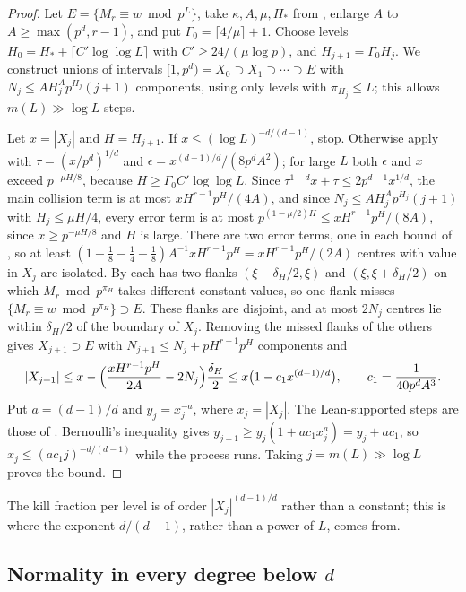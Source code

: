 \documentclass[11pt]{article}
\begin{document}
\begin{proof}
Let $E=\{M_r\equiv w\bmod p^L\}$, take $\kappa,A,\mu,H_*$ from , enlarge $A$ to
$A\ge\max(p^d,r-1)$, and put $\Gamma_0=\lceil4/\mu\rceil+1$. Choose levels
$H_0=H_*+\lceil C'\log\log L\rceil$ with $C'\ge24/(\mu\log p)$, and $H_{j+1}=\Gamma_0H_j$. We construct unions of
intervals $[1,p^d)=X_0\supset X_1\supset\cdots\supset E$ with $N_j\le AH_j^Ap^{H_j}(j+1)$ components, using
only levels with $\pi_{H_j}\le L$; this allows $m(L)\gg\log L$ steps.

Let $x=|X_j|$ and $H=H_{j+1}$. If $x\le(\log L)^{-d/(d-1)}$, stop. Otherwise apply  with
$\tau=(x/p^d)^{1/d}$ and $\epsilon=x^{(d-1)/d}/(8p^dA^2)$; for large $L$ both $\epsilon$ and $x$ exceed
$p^{-\mu H/8}$, because $H\ge\Gamma_0C'\log\log L$. Since $\tau^{1-d}x+\tau\le2p^{d-1}x^{1/d}$, the main
collision term is at most $xH^{r-1}p^H/(4A)$, and since $N_j\le AH_j^Ap^{H_j}(j+1)$ with $H_j\le\mu H/4$, every
error term is at most $p^{(1-\mu/2)H}\le xH^{r-1}p^H/(8A)$, since $x\ge p^{-\mu H/8}$ and $H$ is large. There are two
error terms, one in each bound of , so at least $(1-\frac18-\frac14-\frac18)A^{-1}xH^{r-1}p^H=
xH^{r-1}p^H/(2A)$ centres with value in $X_j$ are isolated. By  each has two flanks $(\xi-\delta_H/2,\xi)$ and
$(\xi,\xi+\delta_H/2)$ on which $M_r\bmod p^{\pi_H}$ takes different constant values, so one flank misses
$\{M_r\equiv w\bmod p^{\pi_H}\}\supset E$. These flanks are disjoint, and at most $2N_j$ centres lie within
$\delta_H/2$ of the boundary of $X_j$. Removing the missed flanks of the others gives $X_{j+1}\supset E$ with
$N_{j+1}\le N_j+pH^{r-1}p^H$ components and
\[
|X_{j+1}|\le x-\Bigl(\frac{xH^{r-1}p^H}{2A}-2N_j\Bigr)\frac{\delta_H}2\le x\bigl(1-c_1x^{(d-1)/d}\bigr),\qquad
c_1=\frac1{40p^dA^3}.
\]
Put $a=(d-1)/d$ and $y_j=x_j^{-a}$, where $x_j=|X_j|$. The Lean-supported steps are those of
. Bernoulli's inequality gives
$y_{j+1}\ge y_j(1+ac_1x_j^a)=y_j+ac_1$, so $x_j\le(ac_1j)^{-d/(d-1)}$ while the process runs. Taking
$j=m(L)\gg\log L$ proves the bound.
\end{proof}

The kill fraction per level is of order $|X_j|^{(d-1)/d}$ rather than a constant; this is where the
exponent $d/(d-1)$, rather than a power of $L$, comes from.

\subsection{Normality in every degree below \texorpdfstring{$d$}{d}}\label{sec:higherdegree}
\end{document}
